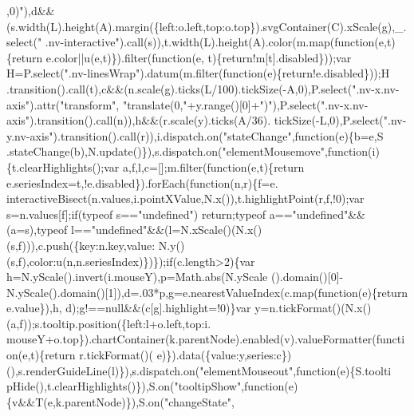 \begin{DoxyCode}
{{      ,0)"}),d&&(s.width(L).height(A).margin(\{left:o.left,top:o.top\}).svgContainer(C).xScale(g),\_.select(\textcolor{stringliteral}{"
      .nv-interactive"}).call(s)),t.width(L).height(A).color(m.map(\textcolor{keyword}{function}(e,t)\{return e.color||u(e,t)\}).filter(\textcolor{keyword}{function}(e,
      t)\{\textcolor{keywordflow}{return}!m[t].disabled\}));var H=P.select(\textcolor{stringliteral}{".nv-linesWrap"}).datum(m.filter(\textcolor{keyword}{function}(e)\{return!e.disabled\}));H
      .transition().call(t),c&&(n.scale(g).ticks(L/100).tickSize(-A,0),P.select(\textcolor{stringliteral}{".nv-x.nv-axis"}).attr(\textcolor{stringliteral}{"transform"},\textcolor{stringliteral}{
      "translate(0,"}+y.range()[0]+\textcolor{stringliteral}{")"}),P.select(\textcolor{stringliteral}{".nv-x.nv-axis"}).transition().call(n)),h&&(r.scale(y).ticks(A/36).
      tickSize(-L,0),P.select(\textcolor{stringliteral}{".nv-y.nv-axis"}).transition().call(r)),i.dispatch.on(\textcolor{stringliteral}{"stateChange"},\textcolor{keyword}{function}(e)\{b=e,S
      .stateChange(b),N.update()\}),s.dispatch.on(\textcolor{stringliteral}{"elementMousemove"},\textcolor{keyword}{function}(i)\{t.clearHighlights();var 
      a,f,l,c=[];m.filter(\textcolor{keyword}{function}(e,t)\{\textcolor{keywordflow}{return} e.seriesIndex=t,!e.disabled\}).forEach(\textcolor{keyword}{function}(n,r)\{f=e.
      interactiveBisect(n.values,i.pointXValue,N.x()),t.highlightPoint(r,f,!0);var s=n.values[f];\textcolor{keywordflow}{if}(typeof s==\textcolor{stringliteral}{"undefined"})\textcolor{keywordflow}{
      return};typeof a==\textcolor{stringliteral}{"undefined"}&&(a=s),typeof l==\textcolor{stringliteral}{"undefined"}&&(l=N.xScale()(N.x()(s,f))),c.push(\{key:n.key,value:
      N.y()(s,f),color:u(n,n.seriesIndex)\})\});\textcolor{keywordflow}{if}(c.length>2)\{var h=N.yScale().invert(i.mouseY),p=Math.abs(N.yScale
      ().domain()[0]-N.yScale().domain()[1]),d=.03*p,g=e.nearestValueIndex(c.map(\textcolor{keyword}{function}(e)\{return e.value\}),h,
      d);g!==null&&(c[g].highlight=!0)\}var y=n.tickFormat()(N.x()(a,f));s.tooltip.position(\{left:l+o.left,top:i.
      mouseY+o.top\}).chartContainer(k.parentNode).enabled(v).valueFormatter(\textcolor{keyword}{function}(e,t)\{\textcolor{keywordflow}{return} r.tickFormat()(
      e)\}).data(\{value:y,series:c\})(),s.renderGuideLine(l)\}),s.dispatch.on(\textcolor{stringliteral}{"elementMouseout"},\textcolor{keyword}{function}(e)\{S.toolti
      pHide(),t.clearHighlights()\}),S.on(\textcolor{stringliteral}{"tooltipShow"},\textcolor{keyword}{function}(e)\{v&&T(e,k.parentNode)\}),S.on(\textcolor{stringliteral}{"changeState"},\textcolor{keyword}{
}}
\end{DoxyCode}
